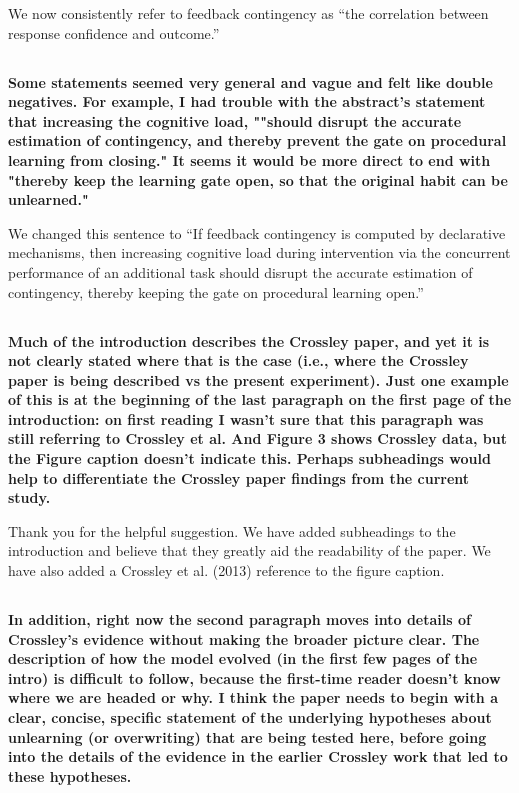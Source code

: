 \documentclass[10pt,a4paper]{article}
\begin{document}
We now consistently refer to feedback contingency as ``the correlation between
response confidence and outcome.''

\subsection{} \textbf{
  Some statements seemed very general and vague and felt like double negatives.
  For example, I had trouble with the abstract's statement that increasing the
  cognitive load, ""should disrupt the accurate estimation of contingency, and
  thereby prevent the gate on procedural learning from closing." It seems it would
  be more direct to end with "thereby keep the learning gate open, so that the
  original habit can be unlearned."
}

We changed this sentence to ``If feedback contingency is computed by declarative
mechanisms, then increasing cognitive load during intervention via the
concurrent performance of an additional task should disrupt the accurate
estimation of contingency, thereby keeping the gate on procedural learning
open.''

\subsection{} \textbf{
  Much of the introduction describes the Crossley paper, and yet it is not clearly
  stated where that is the case (i.e., where the Crossley paper is being described
  vs the present experiment). Just one example of this is at the beginning of the
  last paragraph on the first page of the introduction: on first reading I wasn't
  sure that this paragraph was still referring to Crossley et al. And Figure 3
  shows Crossley data, but the Figure caption doesn't indicate this. Perhaps
  subheadings would help to differentiate the Crossley paper findings from the
  current study.
}

Thank you for the helpful suggestion. We have added subheadings to the
introduction and believe that they greatly aid the readability of the paper. We
have also added a Crossley et al. (2013) reference to the figure caption.

\subsection{} \textbf{
  In addition, right now the second paragraph moves into details of Crossley's
  evidence without making the broader picture clear. The description of how the
  model evolved (in the first few pages of the intro) is difficult to follow,
  because the first-time reader doesn't know where we are headed or why. I think
  the paper needs to begin with a clear, concise, specific statement of the
  underlying hypotheses about unlearning (or overwriting) that are being tested
  here, before going into the details of the evidence in the earlier Crossley work
  that led to these hypotheses.
}
\end{document}
